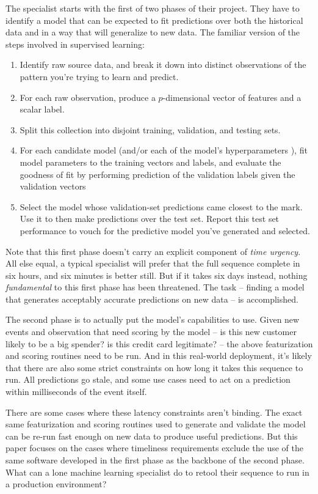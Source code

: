 \documentclass[tablecaption=bottom,wcp]{jmlr}
\begin{document}
 The specialist starts with the first of two phases of their project. They have
to identify a model that can be expected to fit predictions over both the
historical data and in a way that will generalize to new data. The familiar
version of the steps involved in supervised learning:

\begin{enumerate}
 \item Identify raw source data, and break it down into distinct observations of
the pattern you're trying to learn and predict.
 \item For each raw observation, produce a $p$-dimensional vector of features
and a scalar label.
 \item Split this collection into disjoint training, validation, and testing
sets.
 \item For each candidate model (and/or each of the model's hyperparameters
 ), fit model parameters to the training vectors and labels, and
evaluate the goodness of fit by performing prediction of the validation labels
given the validation vectors
 \item Select the model whose validation-set predictions came closest to the
mark. Use it to then make predictions over the test set. Report this test set
performance to vouch for the predictive model you've generated and selected.
\end{enumerate}

 Note that this first phase doesn't carry an explicit component of \emph{time
urgency}. All else equal, a typical specialist will prefer that the full
sequence complete in six hours, and six minutes is better still. But if it takes
six days instead, nothing \emph{fundamental} to this first phase has been
threatened. The task -- finding a model that generates acceptably accurate
predictions on new data -- is accomplished.

 The second phase is to actually put the model's capabilities to use. Given new
events and observation that need scoring by the model -- is this new customer
likely to be a big spender? is this credit card legitimate? -- the above
featurization and scoring routines need to be run. And in this real-world
deployment, it's likely that there are also some strict constraints on how long
it takes this sequence to run. All predictions go stale, and some use cases need
to act on a prediction within milliseconds of the event itself.

 There are some cases where these latency constraints aren't binding. The exact
same featurization and scoring routines used to generate and validate the model
can be re-run fast enough on new data to produce useful predictions. But this
paper focuses on the cases where timeliness requirements exclude the use of the
same software developed in the first phase as the backbone of the second phase.
What can a lone machine learning specialist do to retool their sequence to run
in a production environment?
\end{document}
